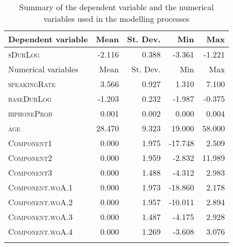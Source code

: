 \begin{table}[H]\fontsize{10}{11}
\caption{Summary of the dependent variable and the numerical variables used in the modelling processes}
\label{tab:5.2}
\centering
\begin{tabular}{lrrrr} 
\lsptoprule
Dependent variable  & Mean   & St. Dev. & Min     & Max     \\ 
\midrule
\textsc{sDurLog}             & -2.116 & 0.388    & -3.361  & -1.221  \\ 
\midrule
Numerical variables & Mean   & St. Dev. & Min     & Max     \\ 
\midrule
\textsc{speakingRate}        & 3.566  & 0.927    & 1.310   & 7.100   \\
\textsc{baseDurLog}          & -1.203 & 0.232    & -1.987  & -0.375  \\
\textsc{biphoneProb}         & 0.001  & 0.002    & 0.000   & 0.004   \\
\textsc{age}                 & 28.470 & 9.323    & 19.000  & 58.000  \\
\textsc{Component1}          & 0.000  & 1.975    & -17.748 & 2.509   \\
\textsc{Component2}          & 0.000  & 1.959    & -2.832  & 11.989  \\
\textsc{Component3}          & 0.000  & 1.488    & -4.312  & 2.983   \\
\textsc{Component.woA.1}     & 0.000  & 1.973    & -18.860 & 2.178   \\
\textsc{Component.woA.2}     & 0.000  & 1.957    & -10.011 & 2.894   \\
\textsc{Component.woA.3}     & 0.000  & 1.487    & -4.175  & 2.928   \\
\textsc{Component.woA.4}     & 0.000  & 1.269    & -3.608  & 3.076   \\
\lspbottomrule
\end{tabular}
\end{table}


